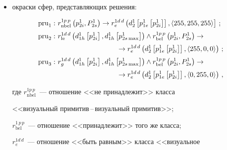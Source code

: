   \begin{itemize}


\item окраски сфер, представляющих решения:


\begin{align*}


\mathrm{pru}_1:\ & r^{1p\,p}_{\mathrm{nbel}}\left( p^1_{2i}, P^1_{2s}\right) \to


r_e^{1d\,d}\left( d_2^1\left[ p^1_{1e}\left[ p^1_{2i}\right]\right],


\langle 255, 255, 255\rangle\right]\,;\\[2pt]


\mathrm{pru}_2:\ & r_{\mathrm{le}}^{1d\,d}\left( d^1_{1h}\left[ 


p^1_{2i}\right], d^1_{1h}\left[ 


p^1_{2s\max}\right] \right) \wedge r^{1p\,p}_{\mathrm{bel}}\left( p^1_{2i}, P^1_{2s}\right) 


\to{}\\[2pt]


&\hspace*{30mm}{}\to r_e^{1d\,d} \left( d_2^1\left[ p^1_{1e}\left[ p^1_{2i}\right]\right], \langle 255, 0, 


0\rangle\right)\,;\\[2pt]


\mathrm{pru}_3:\ & r_g^{1d\,d}\left( d^1_{1h}\left[ p^1_{2i}\right], d^1_{1h}\left[ 


p^1_{2s\max}\right]\right) \wedge r_{\mathrm{bel}}^{1p\,p}\left( p^1_{2i}, P^1_{2s}\right) 


\to{}\\[2pt]


&\hspace*{30mm}{}\to r_e^{1d\,d}\left( d_2^1\left[ p^1_{1e}\left[ p^1_{2i}\right]\right], \langle 0, 255, 


0\rangle\right)\,,


\end{align*}





\noindent


    где $r^{1p\,p}_{\mathrm{nbel}}$~--- отношение <<не принадлежит>> класса 


<<визуальный при\-ми\-тив\,--\,ви\-зу\-аль\-ный примитив>>; 


$r_{\mathrm{bel}}^{1\,p\,p}$~--- отношение <<принадлежит>> того же класса; 


$r_e^{1d\,d}$~--- отношение <<быть равным>> класса <<визуальное  



\end{itemize}
